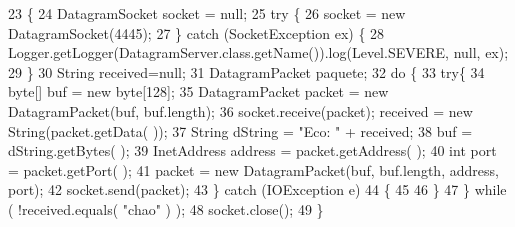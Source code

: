\begin{DoxyCode}
23     \{
24         DatagramSocket socket = null;
25         \textcolor{keywordflow}{try} \{
26             socket = \textcolor{keyword}{new} DatagramSocket(4445);
27         \} \textcolor{keywordflow}{catch} (SocketException ex) \{
28             Logger.getLogger(DatagramServer.class.getName()).log(Level.SEVERE, null, ex);
29         \}
30         String received=null;
31         DatagramPacket paquete;
32         \textcolor{keywordflow}{do} \{
33             \textcolor{keywordflow}{try}\{
34                 byte[] buf = \textcolor{keyword}{new} byte[128];
35                 DatagramPacket packet = \textcolor{keyword}{new} DatagramPacket(buf, buf.length);
36                 socket.receive(packet);  received = \textcolor{keyword}{new} String(packet.getData( ));
37                 String dString = \textcolor{stringliteral}{"Eco: "} + received;  
38                 buf = dString.getBytes( );
39                 InetAddress address = packet.getAddress( );
40                 \textcolor{keywordtype}{int} port = packet.getPort( );
41                 packet = \textcolor{keyword}{new} DatagramPacket(buf, buf.length, address, port);
42                 socket.send(packet);
43             \} \textcolor{keywordflow}{catch} (IOException e)
44             \{
45                 
46             \}
47         \} \textcolor{keywordflow}{while} ( !received.equals( \textcolor{stringliteral}{"chao"} ) );
48         socket.close();
49                 \} 
\end{DoxyCode}
